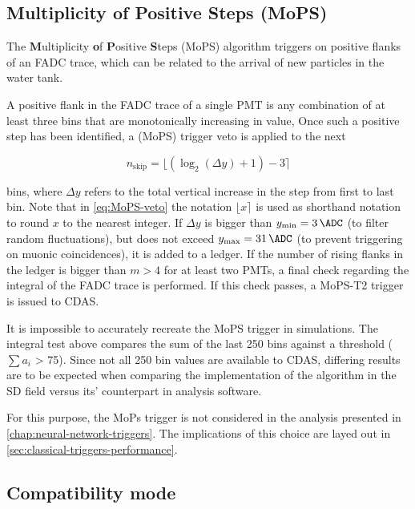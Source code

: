 \subsection{Multiplicity of Positive Steps (MoPS)}
\label{ssec:multiplicity-of-positive-steps}

The \textbf{M}ultiplicity \textbf{o}f \textbf{P}ositive \textbf{S}teps (MoPS) algorithm triggers on positive flanks of an FADC trace, which can be related to the 
arrival of new particles in the water tank. 

A positive flank in the FADC trace of a single PMT is any combination of at least three bins that are monotonically increasing in value, Once such a positive step 
has been identified, a (MoPS) trigger veto is applied to the next 

\begin{equation}
    \label{eq:MoPS-veto}
    n_\text{skip} = \lfloor \left( \log_2(\Delta y) + 1 \right) - 3\rceil
\end{equation}

bins, where $\Delta y$ refers to the total vertical increase in the step from first to last bin. Note that in \autoref{eq:MoPS-veto} the notation $\lfloor x \rceil$ 
is used as shorthand notation to round $x$ to the nearest integer. If $\Delta y$ is bigger than $y_\text{min} = \SI{3}{\ADC}$ (to filter random fluctuations), but 
does not exceed $y_\text{max} = \SI{31}{\ADC}$ (to prevent triggering on muonic coincidences), it is added to a ledger. If the number of rising flanks in the ledger
is bigger than $m>4$ for at least two PMTs, a final check regarding the integral of the FADC trace is performed. If this check passes, a MoPS-T2 trigger is issued 
to CDAS.

It is impossible to accurately recreate the MoPS trigger in simulations. The integral test above compares the sum of the last 250 bins against a threshold 
($\sum a_i$ > 75). Since not all 250 bin values are available to CDAS, differing results are to be expected when comparing the implementation of the algorithm in 
the SD field versus its' counterpart in analysis software. 

For this purpose, the MoPs trigger is not considered in the analysis presented in \autoref{chap:neural-network-triggers}. The implications of this choice are layed
out in \autoref{sec:classical-triggers-performance}.

\subsection{Compatibility mode}
\label{ssec:compatibility-mode}

